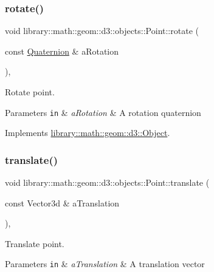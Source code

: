 \subsubsection{\texorpdfstring{rotate()}{rotate()}}
{\footnotesize\ttfamily void library\+::math\+::geom\+::d3\+::objects\+::\+Point\+::rotate (\begin{DoxyParamCaption}\item[{const \hyperlink{classlibrary_1_1math_1_1geom_1_1trf_1_1rot_1_1_quaternion}{Quaternion} \&}]{a\+Rotation }\end{DoxyParamCaption})\hspace{0.3cm}{\ttfamily [override]}, {\ttfamily [virtual]}}



Rotate point. 


\begin{DoxyParams}[1]{Parameters}
\mbox{\tt in}  & {\em a\+Rotation} & A rotation quaternion \\
\hline
\end{DoxyParams}


Implements \hyperlink{classlibrary_1_1math_1_1geom_1_1d3_1_1_object_aabefebc4960530ce6356c4445c5d490e}{library\+::math\+::geom\+::d3\+::\+Object}.

\mbox{\label{classlibrary_1_1math_1_1geom_1_1d3_1_1objects_1_1_point_a7525be2cff259addc949a3aa05a715c7}} 
\subsubsection{\texorpdfstring{translate()}{translate()}}
{\footnotesize\ttfamily void library\+::math\+::geom\+::d3\+::objects\+::\+Point\+::translate (\begin{DoxyParamCaption}\item[{const Vector3d \&}]{a\+Translation }\end{DoxyParamCaption})\hspace{0.3cm}{\ttfamily [override]}, {\ttfamily [virtual]}}



Translate point. 


\begin{DoxyParams}[1]{Parameters}
\mbox{\tt in}  & {\em a\+Translation} & A translation vector \\
\hline
\end{DoxyParams}


